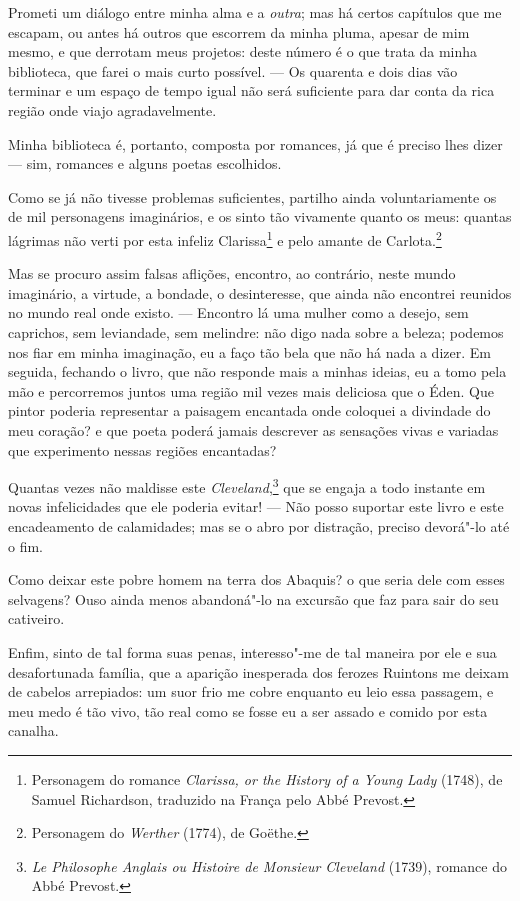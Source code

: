  Prometi um diálogo entre minha alma e a \textit{outra}; mas há certos
capítulos que me escapam, ou antes há outros que escorrem da minha
pluma, apesar de mim mesmo, e que derrotam meus projetos: deste número
é o que trata da minha biblioteca, que farei o mais curto possível. ---
Os quarenta e dois dias vão terminar e um espaço de tempo igual não
será suficiente para dar conta da rica região onde viajo
agradavelmente.

 Minha biblioteca é, portanto, composta por romances, já que é preciso
lhes dizer --- sim, romances e alguns poetas escolhidos.

 Como se já não tivesse problemas suficientes, partilho ainda
voluntariamente os de mil personagens imaginários, e os sinto tão
vivamente quanto os meus: quantas lágrimas não verti por esta infeliz
Clarissa\footnote{ Personagem do romance \textit{Clarissa, or the
History of a Young Lady} (1748), de Samuel Richardson, traduzido na
França pelo Abbé Prevost.} e pelo amante de Carlota.\footnote{ Personagem 
do \textit{Werther} (1774), de Goëthe.}

 Mas se procuro assim falsas aflições, encontro, ao contrário, neste
mundo imaginário, a virtude, a bondade, o desinteresse, que ainda não
encontrei reunidos no mundo real onde existo. --- Encontro lá uma
mulher como a desejo, sem caprichos, sem leviandade, sem melindre: não
digo nada sobre a beleza; podemos nos fiar em minha imaginação, eu a
faço tão bela que não há nada a dizer. Em seguida, fechando o livro,
que não responde mais a minhas ideias, eu a tomo pela mão e percorremos
juntos uma região mil vezes mais deliciosa que o Éden. Que pintor
poderia representar a paisagem encantada onde coloquei a divindade do
meu coração? e que poeta poderá jamais descrever as sensações vivas e
variadas que experimento nessas regiões encantadas?

 Quantas vezes não maldisse este \textit{Cleveland},\footnote{ \textit{Le
Philosophe Anglais ou Histoire de Monsieur Cleveland} (1739), romance
do Abbé Prevost.} que se engaja a todo instante em novas
infelicidades que ele poderia evitar! --- Não posso suportar este livro
e este encadeamento de calamidades; mas se o abro por distração,
preciso devorá"-lo até o fim.

 Como deixar este pobre homem na terra dos Abaquis? o que seria dele com
esses selvagens? Ouso ainda menos abandoná"-lo na excursão que faz para
sair do seu cativeiro.

 Enfim, sinto de tal forma suas penas, interesso"-me de tal maneira por
ele e sua desafortunada família, que a aparição inesperada dos ferozes
Ruintons me deixam de cabelos arrepiados: um suor frio me cobre
enquanto eu leio essa passagem, e meu medo é tão vivo, tão real como se
fosse eu a ser assado e comido por esta canalha.

